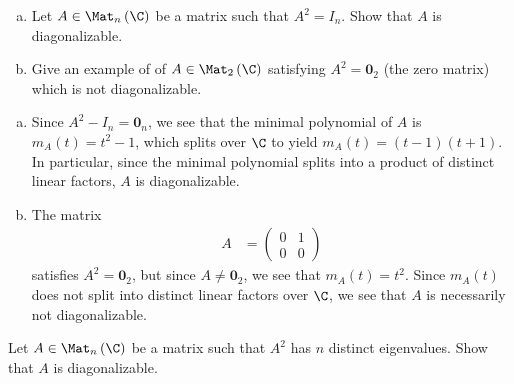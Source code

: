 \documentclass[10pt]{mypackage}
\begin{document}
\begin{problem}[Problem 7]\hfill
  \begin{enumerate}[(a)]
    \item Let $A\in \Mat_{n}\left( \C \right)$ be a matrix such that $A^2 = I_{n}$. Show that $A$ is diagonalizable.
    \item Give an example of of $A\in \Mat_{2}\left( \C \right)$ satisfying $A^2 = \mathbf{0}_{2}$ (the zero matrix) which is not diagonalizable.
  \end{enumerate}
\end{problem}
\begin{solution}\hfill
  \begin{enumerate}[(a)]
    \item Since $A^2- I_n = \mathbf{0}_{n}$, we see that the minimal polynomial of $A$ is $m_A(t) = t^2 - 1$, which splits over $\C$ to yield $m_A(t) = \left( t-1 \right)\left( t+1 \right)$. In particular, since the minimal polynomial splits into a product of distinct linear factors, $A$ is diagonalizable.
    \item The matrix
      \begin{align*}
        A &= \begin{pmatrix}0 & 1 \\ 0 & 0\end{pmatrix}
      \end{align*}
      satisfies $A^2 = \mathbf{0}_{2}$, but since $A \neq \mathbf{0}_{2}$, we see that $m_{A}(t) = t^2$. Since $m_A(t)$ does not split into distinct linear factors over $\C$, we see that $A$ is necessarily not diagonalizable.
  \end{enumerate}
\end{solution}
\begin{problem}[Problem 8]
  Let $A\in \Mat_{n}\left( \C \right)$ be a matrix such that $A^2$ has $n$ distinct eigenvalues. Show that $A$ is diagonalizable.
\end{problem}
\end{document}
